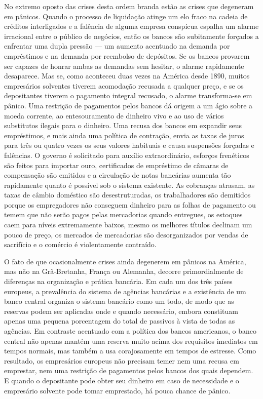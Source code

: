 \documentclass[12pt]{article}
\begin{document}
No extremo oposto das crises desta ordem branda estão as crises que degeneram em pânicos. Quando o processo de liquidação atinge um elo fraco na cadeia de créditos interligados e a falência de alguma empresa conspícua espalha um alarme irracional entre o público de negócios, então os bancos são subitamente forçados a enfrentar uma dupla pressão — um aumento acentuado na demanda por empréstimos e na demanda por reembolso de depósitos. Se os bancos provarem ser capazes de honrar ambas as demandas sem hesitar, o alarme rapidamente desaparece. Mas se, como aconteceu duas vezes na América desde 1890, muitos empresários solventes tiverem acomodação recusada a qualquer preço, e se os depositantes tiverem o pagamento integral recusado, o alarme transforma-se em pânico. Uma restrição de pagamentos pelos bancos dá origem a um ágio sobre a moeda corrente, ao entesouramento de dinheiro vivo e ao uso de vários substitutos ilegais para o dinheiro. Uma recusa dos bancos em expandir seus empréstimos, e mais ainda uma política de contração, envia as taxas de juros para três ou quatro vezes os seus valores habituais e causa suspensões forçadas e falências. O governo é solicitado para auxílio extraordinário, esforços frenéticos são feitos para importar ouro, certificados de empréstimo de câmaras de compensação são emitidos e a circulação de notas bancárias aumenta tão rapidamente quanto é possível sob o sistema existente. As cobranças atrasam, as taxas de câmbio doméstico são desestruturadas, os trabalhadores são demitidos porque os empregadores não conseguem dinheiro para as folhas de pagamento ou temem que não serão pagos pelas mercadorias quando entregues, os estoques caem para níveis extremamente baixos, mesmo os melhores títulos declinam um pouco de preço, os mercados de mercadorias são desorganizados por vendas de sacrifício e o comércio é violentamente contraído.

O fato de que ocasionalmente crises ainda degenerem em pânicos na América, mas não na Grã-Bretanha, França ou Alemanha, decorre primordialmente de diferenças na organização e prática bancária. Em cada um dos três países europeus, a prevalência do sistema de agências bancárias e a existência de um banco central organiza o sistema bancário como um todo, de modo que as reservas podem ser aplicadas onde e quando necessário, embora constituam apenas uma pequena porcentagem do total de passivos à vista de todas as agências. Em contraste acentuado com a política dos bancos americanos, o banco central não apenas mantém uma reserva muito acima dos requisitos imediatos em tempos normais, mas também a usa corajosamente em tempos de estresse. Como resultado, os empresários europeus não precisam temer nem uma recusa em emprestar, nem uma restrição de pagamentos pelos bancos dos quais dependem. E quando o depositante pode obter seu dinheiro em caso de necessidade e o empresário solvente pode tomar emprestado, há pouca chance de pânico.
\end{document}
